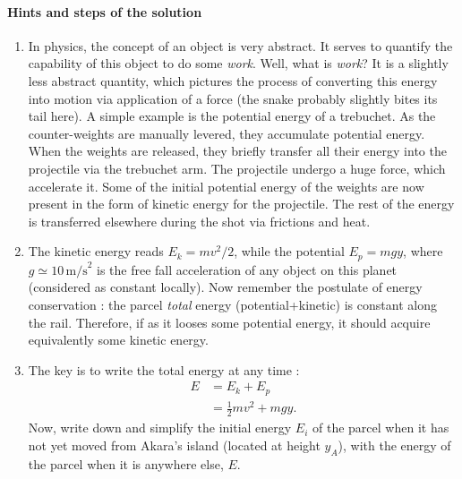 \documentclass{article}
\begin{document}
\begin{tcolorbox}

\paragraph{Hints and steps of the solution}

\begin{enumerate}

\item In physics, the concept of an object  is very abstract. It serves to quantify the capability of this object to do some \textit{work}. Well, what is \textit{work}? It is a slightly less abstract quantity, which pictures the process of converting this energy into motion via application of a force (the snake probably slightly bites its tail here). A simple example is the potential energy of a trebuchet. As the counter-weights are manually levered, they accumulate potential energy. When the weights are released, they briefly transfer all their energy into the projectile via the trebuchet arm. The projectile undergo a huge force, which accelerate it. Some of the initial potential energy of the weights are now present in the form of kinetic energy for the projectile. The rest of the energy is transferred elsewhere during the shot via frictions and heat.

\item The kinetic energy reads $E_k=m v^2/2$, while the potential $E_p=m g y$, where $g\simeq 10 \,\text{m/s}^2$ is the free fall acceleration of any object on this planet (considered as constant locally). Now remember the postulate of energy conservation : the parcel \textit{total} energy (potential+kinetic) is constant along the rail. Therefore, if as it looses some potential energy, it should acquire equivalently some kinetic energy.



\item The key is to write the total energy at any time :
\begin{align}
E &= E_k + E_p\nonumber\\
&= \frac 12  mv^2 + m g y.\nonumber
\end{align}
Now, write down and simplify the initial energy $E_i$ of the parcel when it has not yet moved from Akara's island (located at height $y_A$), with the energy of the parcel when it is anywhere else, $E$.


\end{enumerate}
\end{tcolorbox}
\end{document}
